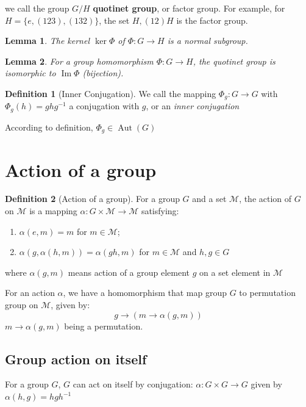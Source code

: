 \documentclass{amsart}
\newcommand{\setM}{\mathcal{M}}
\newtheorem*{lemma}{Lemma}
\theoremstyle{remark}
\theoremstyle{remark}
\theoremstyle{definition}
\newtheorem*{definition}{Definition}
\DeclareMathOperator{\Aut}{Aut}
\DeclareMathOperator{\Image}{Im}
\begin{document}
we call the group $G/H$ \textbf{quotinet group}, or factor group.
For example, for $H = \{e,(123),(132)\}$, the set ${H, (12)H}$ is the factor group.

\begin{lemma}
    The kernel $\ker\Phi$ of $\Phi\colon G\to H$ is a normal subgroup.
\end{lemma}

\begin{lemma}
    For a group homomorphism $\Phi\colon G\to H$, the quotinet group is isomorphic to $\Image\Phi$ (bijection).
\end{lemma}

\vspace{10pt}

\begin{definition}
    [Inner Conjugation]
    We call the mapping $\Phi_g\colon G\to G$ with $\Phi_g(h) = ghg^{-1}$ a conjugation with $g$, or an \emph{inner conjugation}
\end{definition}
According to definition, $\Phi_g \in \Aut(G)$


\vspace{10pt}
\section*{Action of a group}

\begin{definition}
    [Action of a group]
    For a group $G$ and a set $\setM$, the action of $G$ on $\setM$ is a mapping 
    $\alpha\colon G\times \setM \to \setM$ satisfying:
    \begin{enumerate}
        \item $\alpha(e,m) = m$ for $m \in \setM$;
        \item $\alpha(g, \alpha(h,m)) = \alpha(gh, m)$ for $m\in \setM$ and $h,g\in G$
    \end{enumerate}
\end{definition}
where $\alpha(g,m)$ means action of a group element $g$ on a set element in $\setM$

For an action $\alpha$, we have a homomorphism that map group $G$ to permutation group on $\setM$, 
given by:
\[g\to (m\to \alpha(g,m))\]
$m\to \alpha(g,m)$ being a permutation. 

\subsection*{Group action on itself}
For a group $G$, $G$ can act on itself by conjugation: $\alpha\colon G\times G \to G$ given by
$\alpha(h,g) = hgh^{-1}$
\end{document}

